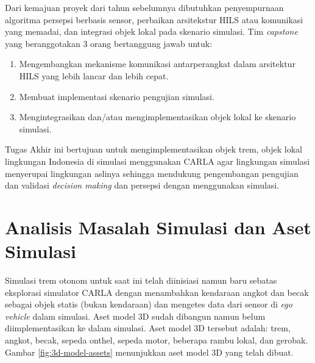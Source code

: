 Dari kemajuan proyek dari tahun sebelumnya dibutuhkan  penyempurnaan algoritma
persepsi berbasis sensor, perbaikan arsitekstur HILS atau komunikasi yang
memadai, dan integrasi objek lokal pada skenario simulasi. Tim \textit{capstone}
yang beranggotakan 3 orang bertanggung jawab untuk:

\begin{enumerate}

	\item Mengembangkan mekanisme komunikasi antarperangkat dalam arsitektur
	HILS yang lebih lancar dan lebih cepat.
	\item Membuat implementasi skenario pengujian simulasi.
	\item Mengintegrasikan dan/atau mengimplementasikan objek lokal ke skenario
	simulasi.

\end{enumerate}

Tugas Akhir ini bertujuan untuk mengimplementasikan objek trem, objek lokal
lingkungan Indonesia di simulasi menggunakan CARLA agar lingkungan simulasi
menyerupai lingkungan aslinya sehingga mendukung pengembangan pengujian dan
validasi \textit{decision making} dan persepsi dengan menggunakan simulasi.

\section{Analisis Masalah Simulasi dan Aset Simulasi}

Simulasi trem otonom untuk saat ini telah diinisiasi namun baru sebatas
eksplorasi simulator CARLA dengan menambahkan kendaraan angkot dan becak sebagai
objek statis (bukan kendaraan) dan mengetes data dari sensor di \textit{ego
vehicle} dalam simulasi. Aset model 3D sudah dibangun namun belum
diimplementasikan ke dalam simulasi. Aset model 3D tersebut adalah: trem,
angkot, becak, sepeda onthel, sepeda motor, beberapa rambu lokal, dan gerobak.
Gambar \ref{fig:3d-model-assets} menunjukkan aset model 3D yang telah dibuat.

